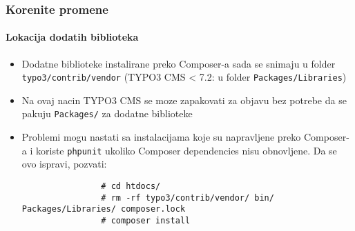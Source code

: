 \begin{frame}[fragile]
	\frametitle{Korenite promene}
	\framesubtitle{Lokacija dodatih biblioteka}

	\begin{itemize}

		\item Dodatne biblioteke instalirane preko Composer-a sada se snimaju u folder \texttt{typo3/contrib/vendor} \newline
			\small
				(TYPO3 CMS < 7.2: u folder \texttt{Packages/Libraries})
			\normalsize

		\item Na ovaj nacin TYPO3 CMS se moze zapakovati za objavu bez potrebe da se pakuju \texttt{Packages/} za dodatne biblioteke

		\item Problemi mogu nastati sa instalacijama koje su napravljene preko Composer-a i koriste \texttt{phpunit}
			ukoliko Composer dependencies nisu obnovljene. Da se ovo ispravi, pozvati:

			\begin{lstlisting}
				# cd htdocs/
				# rm -rf typo3/contrib/vendor/ bin/ Packages/Libraries/ composer.lock
				# composer install
			\end{lstlisting}
	\end{itemize}

\end{frame}

